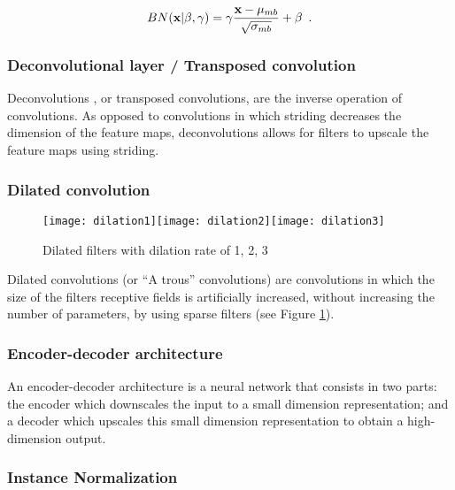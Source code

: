 \begin{equation}
	BN(\textbf{x}|\beta,\gamma) = \gamma\frac{\textbf{x} - {\mu}_{mb}}{\sqrt{{\sigma}_{mb}}} + \beta \enspace .
\end{equation}

\subsubsection*{Deconvolutional layer / Transposed convolution} \label{gl:deconv}

Deconvolutions \citep{Long2015}, or transposed convolutions, are the inverse operation of convolutions. As opposed to convolutions in which striding decreases the dimension of the feature maps, deconvolutions allows for filters to upscale the feature maps using striding.

\subsubsection*{Dilated convolution} \label{gl:dilconv}

\begin{figure}
	\centering
	\texttt{[image: dilation1]}\hspace{1cm}\texttt{[image: dilation2]}\hspace{1cm}\texttt{[image: dilation3]}
	\caption{ Dilated filters with dilation rate of 1, 2, 3}
	\label{fig:dilation}
\end{figure}

Dilated convolutions \citep{Yu2015} (or ``A trous'' convolutions) are convolutions in which the size of the filters receptive fields is artificially increased, without increasing the number of parameters, by using sparse filters (see Figure \ref{fig:dilation}). 

\subsubsection*{Encoder-decoder architecture} \label{gl:encdec} 

An encoder-decoder architecture is a neural network that consists in two parts: the encoder which downscales the input to a small dimension representation; and a decoder which upscales this small dimension representation to obtain a high-dimension output.

\subsubsection*{Instance Normalization} \label{gl:instnorm}

